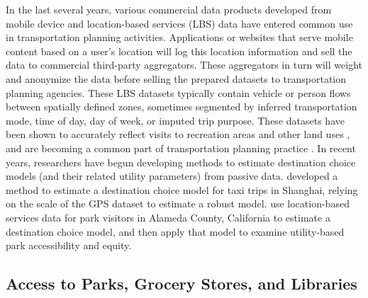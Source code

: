\documentclass[3p, authoryear, review]{elsarticle} %
\begin{document}
In the last several years, various commercial data products developed from
mobile device and location-based services (LBS) data have entered common use in
transportation planning activities. Applications or websites that serve mobile
content based on a user's location will log this location information and
sell the data to commercial third-party aggregators. These aggregators in turn will weight
and anonymize the data before selling the prepared datasets to transportation
planning agencies. These LBS datasets typically contain
vehicle or person flows between spatially defined zones, sometimes segmented by
inferred transportation mode, time of day, day of week, or imputed trip purpose.
These datasets have been shown to accurately reflect visits to recreation areas
and other land uses \citep{monz2019}, and are becoming a common part of transportation
planning practice \citep{naboulsi2016, tcrp138}. In recent years, researchers have
begun developing methods to estimate destination choice models (and their
related utility parameters) from passive data. \citet{zhu2018} developed a method to
estimate a destination choice model for taxi trips in Shanghai, relying on the
scale of the GPS dataset to estimate a robust model. \citet{alamedaparks} use
location-based services data for park visitors in Alameda County, California to
estimate a destination choice model, and then apply that model to examine
utility-based park accessibility and equity.

\hypertarget{access-to-parks-grocery-stores-and-libraries}{%
\subsection{Access to Parks, Grocery Stores, and Libraries}\label{access-to-parks-grocery-stores-and-libraries}}
\end{document}
